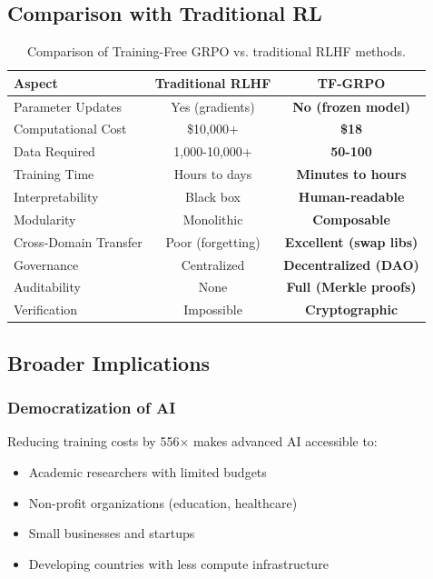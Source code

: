 \subsection{Comparison with Traditional RL}

\begin{table}[h]
\centering
\caption{Comparison of Training-Free GRPO vs. traditional RLHF methods.}
\label{tab:comparison}
\begin{tabular}{@{}lcc@{}}
\toprule
\textbf{Aspect} & \textbf{Traditional RLHF} & \textbf{TF-GRPO} \\
\midrule
Parameter Updates & Yes (gradients) & \textbf{No (frozen model)} \\
Computational Cost & \$10,000+ & \textbf{\$18} \\
Data Required & 1,000-10,000+ & \textbf{50-100} \\
Training Time & Hours to days & \textbf{Minutes to hours} \\
Interpretability & Black box & \textbf{Human-readable} \\
Modularity & Monolithic & \textbf{Composable} \\
Cross-Domain Transfer & Poor (forgetting) & \textbf{Excellent (swap libs)} \\
Governance & Centralized & \textbf{Decentralized (DAO)} \\
Auditability & None & \textbf{Full (Merkle proofs)} \\
Verification & Impossible & \textbf{Cryptographic} \\
\bottomrule
\end{tabular}
\end{table}

\subsection{Broader Implications}

\subsubsection{Democratization of AI}
Reducing training costs by 556× makes advanced AI accessible to:
\begin{itemize}
    \item Academic researchers with limited budgets
    \item Non-profit organizations (education, healthcare)
    \item Small businesses and startups
    \item Developing countries with less compute infrastructure
\end{itemize}

